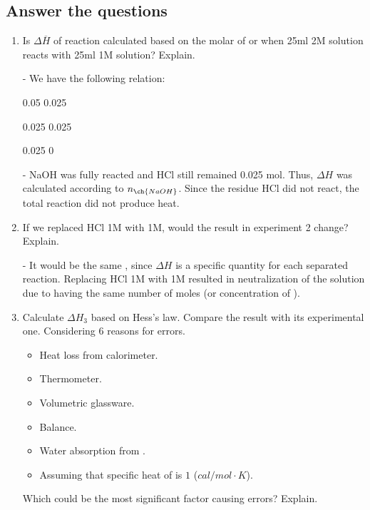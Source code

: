 \subsection{Answer the questions}
\begin{enumerate}
	\item Is $\Delta \overline{H}$ of reaction  calculated based on the molar of  or  when 25ml  2M solution reacts with 25ml  1M solution? Explain.
	
	- We have the following relation:
	
	\hspace{2cm}
	
	\hspace{2cm}0.05 \hspace{0.4cm} 0.025
	
	\hspace{2cm}0.025 \hspace{0.2cm} 0.025
	
	\hspace{2cm}0.025 \hspace{0.2cm} 0
	
	- NaOH was fully reacted and HCl still remained 0.025 mol. Thus, $\Delta H$ was calculated according to $n_{\ch{NaOH}}$. Since the residue HCl did not react, the total reaction did not produce heat.
	
	\item If we replaced HCl 1M with  1M, would the result in experiment 2 change? Explain.
	
	- It would be the same , since $\Delta H$ is a specific quantity for each separated reaction. Replacing HCl 1M with  1M resulted in neutralization of the solution due to having the same number of moles (or concentration of ).
	
	\item Calculate $\Delta H_3$ based on Hess's law. Compare the result with its experimental one. Considering 6 reasons for errors.
	\begin{itemize}[label=-]
		\item Heat loss from calorimeter.
		\item Thermometer.
		\item Volumetric glassware.
		\item Balance.
		\item Water absorption from .
		\item Assuming that specific heat of  is $1$ ($cal/mol \cdot K$).
	\end{itemize}
	Which could be the most significant factor causing errors? Explain.
	

\end{enumerate}
